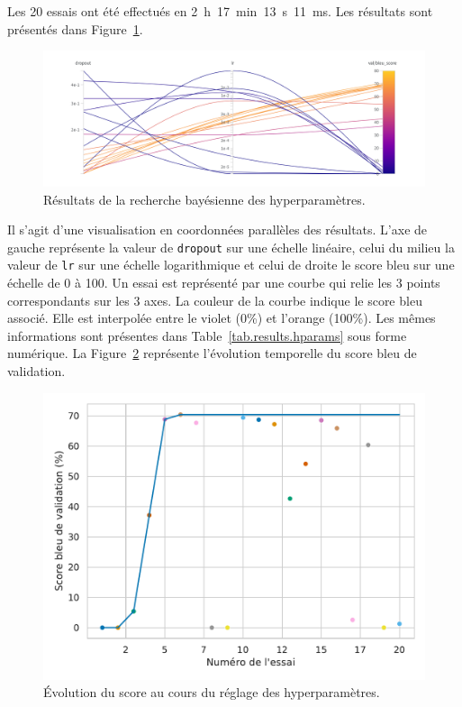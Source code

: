 Les 20 essais ont été effectués en 2~h~17~min~13~s~11~ms.
Les résultats sont présentés dans Figure~\ref{fig.results.hparams}.
\begin{figure}[hbt]
    \centering
    \includegraphics[width=\linewidth]{assets/images/sweep.png}
    \caption{Résultats de la recherche bayésienne des hyperparamètres.}%
    \label{fig.results.hparams}
\end{figure}
Il s'agit d'une visualisation en coordonnées parallèles des résultats.
L'axe de gauche représente la valeur de \verb|dropout| sur une échelle linéaire, 
celui du milieu la valeur de \verb|lr| sur une échelle logarithmique 
et celui de droite le score \gls{bleu} sur une échelle de 0 à 100.
Un essai est représenté par une courbe qui relie les 3 points correspondants sur les 3 axes.
La couleur de la courbe indique le score \gls{bleu} associé.
Elle est interpolée entre le violet (0\%) et l'orange (100\%).
Les mêmes informations sont présentes dans Table~\ref{tab.results.hparams} sous forme numérique.
La Figure~\ref{fig.results.hparams.time} représente l'évolution temporelle du score \gls{bleu} de validation.
\begin{figure}[hbt]
    \begin{center}
        \includegraphics[width=.5\linewidth]{assets/python/sweeps.pdf}
    \end{center}
    \caption{Évolution du score  au cours du réglage des hyperparamètres.}
    \label{fig.results.hparams.time}
\end{figure}

